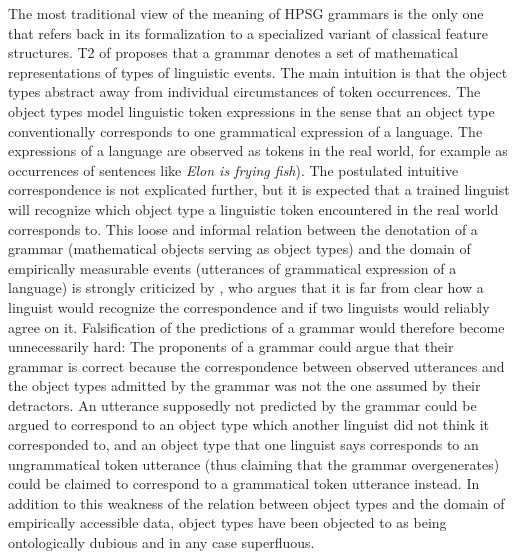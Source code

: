 \documentclass[output=paper
                ,modfonts
                ,nonflat
	        ,collection
	        ,collectionchapter
	        ,collectiontoclongg
 	        ,biblatex
                ,babelshorthands
                ,newtxmath
                ,draftmode
                ,colorlinks, citecolor=brown
]{./langsci/langscibook}
\begin{document}
{{The most traditional view of the meaning of HPSG grammars is the only
one that refers back in its formalization to a specialized variant of
classical feature structures. T2 of \citet{PollardSag1994} proposes
that a grammar denotes a set of mathematical representations of types
of linguistic events. The main intuition is that the object types
abstract away from individual circumstances of token occurrences. The
object types model linguistic token expressions in the sense that an
object type conventionally corresponds to one grammatical expression
of a language. The expressions of a language are observed as tokens in
the real world, for example as occurrences of sentences like
\emph{Elon is frying fish}).  The postulated intuitive correspondence is not
explicated further, but it is expected that a trained linguist will
recognize which object type a linguistic token encountered in the real
world corresponds to.  This loose and informal relation between the
denotation of a grammar (mathematical objects serving as object types)
and the domain of empirically measurable events (utterances of
grammatical expression of a language) is strongly criticized by
\citet{King99a-u}, who argues that it is far from clear how a linguist
would recognize the correspondence and if two linguists would reliably
agree on it. Falsification of the predictions
of a grammar would therefore become unnecessarily hard: The proponents
of a grammar could argue that their grammar is correct because the
correspondence between observed utterances and the object types
admitted by the grammar was not the one assumed by their
detractors. An utterance supposedly not predicted by the grammar could
be argued to correspond to an object type which another linguist did not
think it corresponded to, and an object type
that one linguist says corresponds to an ungrammatical token utterance
(thus claiming that the grammar overgenerates) could be claimed
to correspond  to a grammatical token utterance instead. In addition to this
weakness of the relation between object types and the domain of empirically
accessible data, object types have been objected to as being ontologically
dubious and in any case superfluous.

}}
\end{document}
